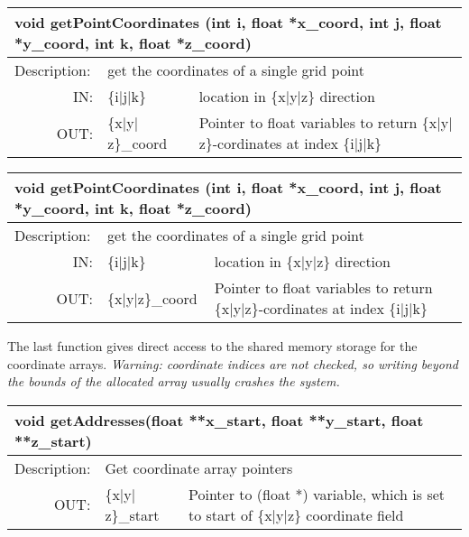 \latexonly
\begin{longtable}{|p{4cm}|p{2.5cm}|p{7cm}|}
\hline
\multicolumn{3}{|p{13.5cm}|}{\bf void getPointCoordinates \newline
(int i, float *x\_coord, int j,  float *y\_coord,  int k, float *z\_coord)}\\
\hline
{Description:}  
           & \multicolumn{2}{p{9.5cm}|}{get the coordinates of a single grid point} \\
\hline
\multicolumn{1}{|r|}{IN:} & \multicolumn{1}{p{3cm}|}{\{i$\mid$j$\mid$k\}} 
                          & \multicolumn{1}{p{5cm}|}{location in 
			     \{x$\mid$y$\mid$z\} direction}\\
\hline
\multicolumn{1}{|r|}{OUT:} & \multicolumn{1}{p{3cm}|}{\{x$\mid$y$\mid$z\}\_coord} 
                          & \multicolumn{1}{p{5cm}|}{Pointer to float variables to
			  return \{x$\mid$y$\mid$z\}-cordinates at 
			  index \{i$\mid$j$\mid$k\}}\endhead
\hline
\end{longtable}
\endlatexonly

\begin{htmlonly}
\begin{longtable}{|p{4cm}|p{2.5cm}|p{7cm}|}
\hline
\multicolumn{3}{|p{13.5cm}|}{\bf void getPointCoordinates \newline
(int i, float *x\_coord, int j,  float *y\_coord,  int k, float *z\_coord)}\\
\hline
{Description:}  
           & \multicolumn{2}{p{9.5cm}|}{get the coordinates of a single grid point} \\
\hline
\multicolumn{1}{|r|}{IN:} & \multicolumn{1}{p{3cm}|}{\{i|j|k\}} 
                          & \multicolumn{1}{p{5cm}|}{location in 
			     \{x|y|z\} direction}\\
\hline
\multicolumn{1}{|r|}{OUT:} & \multicolumn{1}{p{3cm}|}{\{x|y|z\}\_coord} 
                          & \multicolumn{1}{p{5cm}|}{Pointer to float variables to
			  return \{x|y|z\}-cordinates at 
			  index \{i|j|k\}}\endhead
\hline
\end{longtable}
\end{htmlonly}

The last function gives direct access to the shared memory storage for the 
coordinate arrays. \emph{Warning: coordinate indices are not checked, so writing
beyond the bounds of the allocated array usually crashes the system.}

\latexonly 
\begin{longtable}{|p{4cm}|p{2.5cm}|p{7cm}|}
\hline
\multicolumn{3}{|p{13.5cm}|}{\bf void getAddresses(float **x\_start, float **y\_start, 
                       float **z\_start)}\\
\hline
{Description:}  
           & \multicolumn{2}{p{9.5cm}|}{Get coordinate array pointers} \\
\hline
\multicolumn{1}{|r|}{OUT:} & \multicolumn{1}{p{3cm}|}{\{x$\mid$y$\mid$z\}\_start} 
                          & \multicolumn{1}{p{5cm}|}{Pointer to (float *) variable, 
			  which is set to start of \{x$\mid$y$\mid$z\} coordinate
			  field}\endhead
\hline
\end{longtable} 
\endlatexonly

